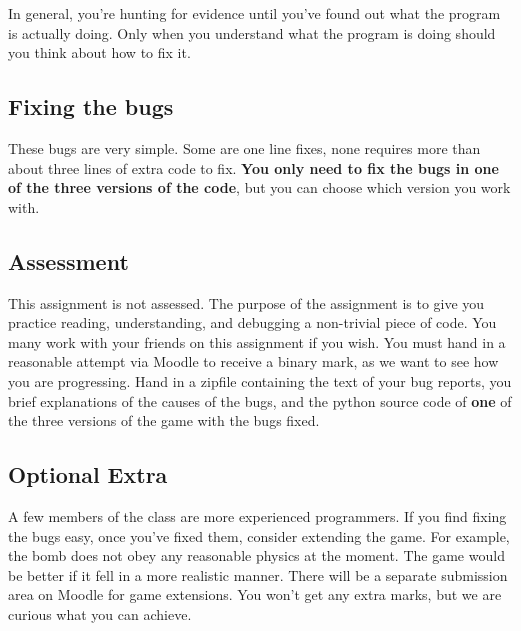 \documentclass{article}
\begin{document}
In general, you're hunting for evidence until you've found out what
the program is actually doing.  Only when you understand what the
program is doing should you think about how to fix it.

\subsection{Fixing the bugs}

These bugs are very simple.  Some are one line fixes, none requires
more than about three lines of extra code to fix.  \textbf{You only
  need to fix the bugs in one of the three versions of the code}, but
you can choose which version you work with.

\subsection*{Assessment}

This assignment is not assessed.  The purpose of the assignment is to
give you practice reading, understanding, and debugging a non-trivial
piece of code.  You many work with your friends on this assignment if
you wish.  You must hand in a reasonable attempt via Moodle to receive
a binary mark, as we want to see how you are progressing.  Hand in a
zipfile containing the text of your bug reports, you brief
explanations of the causes of the bugs, and the python source code of
\textbf{one} of the three versions of the game with the bugs fixed.

\subsection*{Optional Extra}

A few members of the class are more experienced programmers.  If you
find fixing the bugs easy, once you've fixed them, consider extending
the game.  For example, the bomb does not obey any reasonable physics
at the moment.  The game would be better if it fell in a more
realistic manner.  There will be a separate submission area on Moodle
for game extensions.  You won't get any extra marks, but we are
curious what you can achieve.
\end{document}
